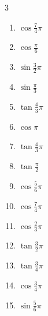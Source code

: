 \begin{multicols}{3}
\begin{enumerate}
  \item $\displaystyle \cos{\frac{7}{4}\pi}$

  \item $\displaystyle \cos{\frac{\pi}{6}}$

  \item $\displaystyle \sin{\frac{3}{2}\pi}$
        \phantom{$\displaystyle =-1$}

  \item $\displaystyle \sin{\frac{\pi}{3}}$

  \item $\displaystyle \tan{\frac{4}{3}\pi}$

  \item $\displaystyle \cos{\pi}$
        \phantom{$\displaystyle =-1$}

  \item $\displaystyle \tan{\frac{4}{3}\pi}$

  \item $\displaystyle \tan{\frac{\pi}{2}}$
        \phantom{$\displaystyle \quad なし$}

\columnbreak %

  \item $\displaystyle \cos{\frac{5}{6}\pi}$

  \item $\displaystyle \cos{\frac{7}{4}\pi}$

  \item $\displaystyle \cos{\frac{2}{3}\pi}$

  \item $\displaystyle \tan{\frac{3}{2}\pi}$
        \phantom{$\displaystyle \quad なし$}

  \item $\displaystyle \tan{\frac{3}{4}\pi}$
        \phantom{$\displaystyle =-1$}

  \item $\displaystyle \cos{\frac{3}{4}\pi}$

  \item $\displaystyle \sin{\frac{5}{6}\pi}$


\end{enumerate}
\end{multicols}
